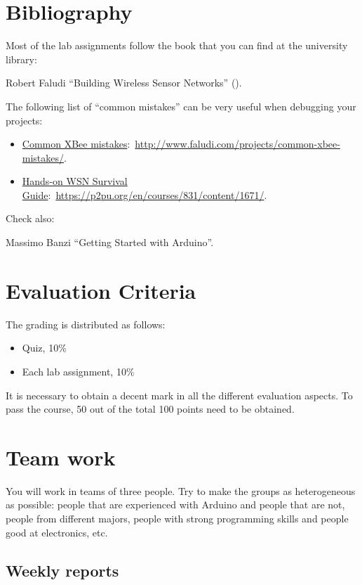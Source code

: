 \section{Bibliography}

Most of the lab assignments follow the book that you can find at the university library:

Robert Faludi ``Building Wireless Sensor Networks'' (\cite{faludi2010bws}).

The following list of ``common mistakes'' can be very useful when debugging your projects:
\begin{itemize}
	\item \href{http://www.faludi.com/projects/common-xbee-mistakes/}{Common XBee mistakes}:~\url{http://www.faludi.com/projects/common-xbee-mistakes/}.
	\item \href{https://p2pu.org/en/courses/831/content/1671/}{Hands-on WSN Survival Guide}:~\url{https://p2pu.org/en/courses/831/content/1671/}.
\end{itemize}


Check also:

Massimo Banzi ``Getting Started with Arduino''.

\section{Evaluation Criteria}

The grading is distributed as follows:
\begin{itemize}
\item Quiz, 10\%
\item Each lab assignment, 10\%
\end{itemize}

It is necessary to obtain a decent mark in all the different evaluation aspects.
To pass the course, 50 out of the total 100 points need to be obtained.

\section{Team work}

You will work in teams of three people.
Try to make the groups as heterogeneous as possible: people that are experienced with Arduino and people that are not, people from different majors, people with strong programming skills and people good at electronics, etc.

	\subsection{Weekly reports}
	
